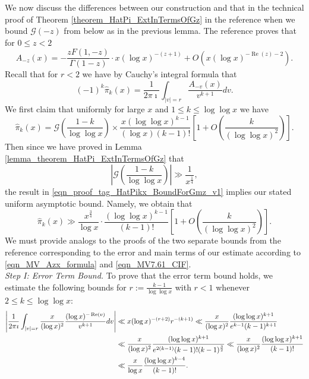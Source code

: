 \documentclass[11pt,reqno,a4letter]{article}
\numberwithin{figure}{section}
\numberwithin{table}{section}
\theoremstyle{plain}
\numberwithin{theorem}{section}
\theoremstyle{definition}
\renewcommand{\Re}{\operatorname{Re}}
\begin{document}
We now discuss the differences between our construction and that in 
the technical proof of Theorem \ref{theorem_HatPi_ExtInTermsOfGz} 
in the reference when we bound $\mathcal{G}(-z)$ from below as in 
the previous lemma. 
The reference proves that for $0 \leq z < 2$ \cite[Thm.\ 7.18]{MV} 
\begin{equation} 
\label{eqn_MV_Azx_formula} 
A_{-z}(x) = -\frac{z F(1, -z)}{\Gamma(1-z)} \cdot x (\log x)^{-(z+1)} + 
     O\left(x (\log x)^{-\Re(z) - 2}\right). 
\end{equation}
Recall that for $r < 2$ we have by Cauchy's integral formula that 
\begin{equation} 
\label{eqn_MV7.61_CIF} 
(-1)^{k} \widehat{\pi}_k(x) = \frac{1}{2\pi\imath} \int_{|v|=r} 
     \frac{A_{-v}(x)}{v^{k+1}} dv. 
\end{equation} 
We first claim that uniformly for large $x$ and $1 \leq k \leq \log\log x$ we have 
\begin{equation} 
\label{eqn_proof_tag_HatPikx_BoundForGmz_v1} 
\widehat{\pi}_k(x) = \mathcal{G}\left(\frac{1-k}{\log\log x}\right) \times 
     \frac{x (\log\log x)^{k-1}}{(\log x) (k-1)!} 
     \left[1 + O\left(\frac{k}{(\log\log x)^2}\right)\right]. 
\end{equation} 
Then since we have proved in Lemma \ref{lemma_theorem_HatPi_ExtInTermsOfGz} that 
\[
\left\lvert \mathcal{G}\left(\frac{1-k}{\log\log x}\right) \right\rvert \gg 
     \frac{1}{x^{\frac{1}{4}}}, 
\]
the result in \eqref{eqn_proof_tag_HatPikx_BoundForGmz_v1} implies our 
stated uniform asymptotic bound. Namely, we obtain that 
\[
\widehat{\pi}_k(x) \gg 
     \frac{x^{\frac{3}{4}}}{\log x} \cdot 
     \frac{(\log\log x)^{k-1}}{(k-1)!} \left[1 + 
     O\left(\frac{k}{(\log\log x)^2}\right)\right]. 
\]
We must provide analogs to the proofs of the 
two separate bounds from the reference corresponding to the error and 
main terms of our estimate according to 
\eqref{eqn_MV_Azx_formula} and \eqref{eqn_MV7.61_CIF}. \\ 
\textit{Step I: Error Term Bound.} 
To prove that the error term bound holds, we estimate the following bounds for 
$r := \frac{k-1}{\log\log x}$ with $r < 1$ whenever $2 \leq k \leq \log\log x$: 
\begin{align} 
\notag 
\left\lvert \frac{1}{2\pi\imath} \int_{|v|=r} 
     \frac{x}{(\log x)^2} \frac{(\log x)^{-\Re(v)}}{v^{k+1}} dv \right\rvert & \ll 
     x (\log x)^{-(r+2)} r^{-(k+1)} 
     \ll \frac{x}{(\log x)^2} \frac{(\log\log x)^{k+1}}{e^{k-1} (k-1)^{k+1}} \\ 
\notag 
     & \ll \frac{x}{(\log x)^2} \frac{(\log\log x)^{k+1}}{e^{2(k-1)} (k-1)! (k-1)^{\frac{3}{2}}} 
     \ll \frac{x}{(\log x)^{2}} \frac{(\log\log x)^{k+1}}{(k-1)!} \\ 
\label{eqn_proof_tag_ErrorTermBounds_v1} 
     & \ll \frac{x}{\log x} \frac{(\log\log x)^{k-4}}{(k-1)!}. 
\end{align} 
\end{document}
